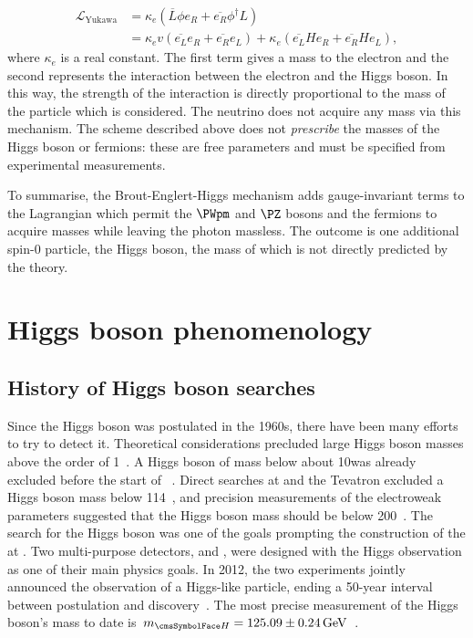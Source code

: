 \begin{equation}
\label{eq:th:yukawa_coupling}
\begin{split}
  \mathcal{L}_{\textrm{Yukawa}} &= \kappa_{e} (\overline{L} \phi  e_{R} + \overline{e_{R}} \phi^{\dagger} L )\\
                       &=  \kappa_{e} v (\overline{e_{L}} e_{R} + \overline{e_{R}} e_{L} ) +  \kappa_{e}   (\overline{e_{L}} H e_{R} + \overline{e_{R}} H e_{L} ),
\end{split}
\end{equation}
where $\kappa_{e}$ is a real constant. The first term gives a mass to the electron and the second represents the interaction between the electron and the Higgs boson. In this way, the strength of the interaction is directly proportional to the mass of the particle which is considered. The neutrino does not acquire any mass via this mechanism. The scheme described above does not \emph{prescribe} the masses of the Higgs boson or fermions: these are free parameters and must be specified from experimental measurements.

To summarise, the Brout-Englert-Higgs mechanism adds gauge-invariant terms to the \SM Lagrangian which permit the $\PWpm$ and $\PZ$ bosons and the fermions to acquire masses while leaving the photon massless. The outcome is one additional spin-0 particle, the Higgs boson, the mass of which is not directly predicted by the theory.

 
\section{Higgs boson phenomenology}
\subsection{History of Higgs boson searches}

Since the Higgs boson was postulated in the 1960s, there have been many efforts to try to detect it. Theoretical considerations precluded large Higgs boson masses above the order of 1\TeV~\cite{Heller:1993yv}. 
A Higgs boson of mass below about 10\GeV was already excluded before the start of \LEP~\cite{Wu:2014vva}.
Direct searches at \LEP and the Tevatron excluded a Higgs boson mass below 114\GeV~\cite{Barate:2003sz,TEVNPH:2012ab}, and precision measurements of the electroweak parameters suggested that the Higgs boson mass should be below 200\GeV~\cite{Renton:2004wd}. The search for the Higgs boson was one of the goals prompting the construction of the \LHC at \CERN. Two multi-purpose detectors, \ATLAS and \CMS, were designed with the Higgs observation as one of their main physics goals. In 2012, the two experiments jointly announced the observation of a Higgs-like particle, ending a 50-year interval between postulation and discovery~\cite{CMSHDisc,ATLASHDisc}. The most precise measurement of the Higgs boson's mass to date is $\mH=125.09\pm0.24\GeV$~\cite{PhysRevLett.114.191803}.

